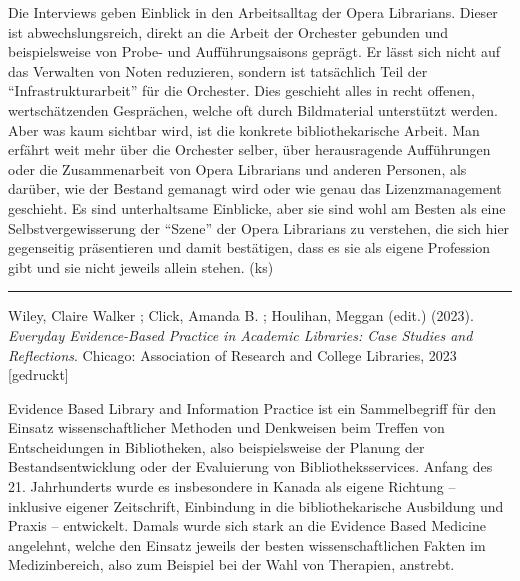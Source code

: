 \documentclass[a4paper,
fontsize=11pt,
oneside,
numbers=noperiodatend,
parskip=half-,
bibliography=totoc,
final
]{scrartcl}
\begin{document}
Die Interviews geben Einblick in den Arbeitsalltag der Opera Librarians.
Dieser ist abwechslungsreich, direkt an die Arbeit der Orchester
gebunden und beispielsweise von Probe- und Aufführungsaisons geprägt. Er
lässt sich nicht auf das Verwalten von Noten reduzieren, sondern ist
tatsächlich Teil der \enquote{Infrastrukturarbeit} für die Orchester.
Dies geschieht alles in recht offenen, wertschätzenden Gesprächen,
welche oft durch Bildmaterial unterstützt werden. Aber was kaum sichtbar
wird, ist die konkrete bibliothekarische Arbeit. Man erfährt weit mehr
über die Orchester selber, über herausragende Aufführungen oder die
Zusammenarbeit von Opera Librarians und anderen Personen, als darüber,
wie der Bestand gemanagt wird oder wie genau das Lizenzmanagement
geschieht. Es sind unterhaltsame Einblicke, aber sie sind wohl am Besten
als eine Selbstvergewisserung der \enquote{Szene} der Opera Librarians
zu verstehen, die sich hier gegenseitig präsentieren und damit
bestätigen, dass es sie als eigene Profession gibt und sie nicht jeweils
allein stehen. (ks)

\begin{center}\rule{0.5\linewidth}{0.5pt}\end{center}

\pagebreak

Wiley, Claire Walker ; Click, Amanda B. ; Houlihan, Meggan (edit.)
(2023). \emph{Everyday Evidence-Based Practice in Academic Libraries:
Case Studies and Reflections}. Chicago: Association of Research and
College Libraries, 2023 {[}gedruckt{]}

Evidence Based Library and Information Practice ist ein Sammelbegriff
für den Einsatz wissenschaftlicher Methoden und Denkweisen beim Treffen
von Entscheidungen in Bibliotheken, also beispielsweise der Planung der
Bestandsentwicklung oder der Evaluierung von Bibliotheksservices. Anfang
des 21. Jahrhunderts wurde es insbesondere in Kanada als eigene Richtung
-- inklusive eigener Zeitschrift, Einbindung in die bibliothekarische
Ausbildung und Praxis -- entwickelt. Damals wurde sich stark an die
Evidence Based Medicine angelehnt, welche den Einsatz jeweils der besten
wissenschaftlichen Fakten im Medizinbereich, also zum Beispiel bei der
Wahl von Therapien, anstrebt.
\end{document}

